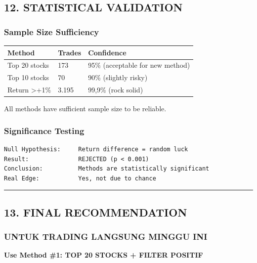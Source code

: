 \documentclass[
  10pt,
  a4paper,
]{article}
\begin{document}
\subsection{12. STATISTICAL VALIDATION}\label{statistical-validation}

\subsubsection{Sample Size Sufficiency}\label{sample-size-sufficiency}

\begin{longtable}[]{@{}lll@{}}
\toprule\noalign{}
Method & Trades & Confidence \\
\midrule\noalign{}
\endhead
\bottomrule\noalign{}
\endlastfoot
Top 20 stocks & 173 & 95\% (acceptable for new method) \\
Top 10 stocks & 70 & 90\% (slightly risky) \\
Return \textgreater+1\% & 3.195 & 99,9\% (rock solid) \\
\end{longtable}

All methods have sufficient sample size to be reliable.

\subsubsection{Significance Testing}\label{significance-testing}

\begin{verbatim}
Null Hypothesis:     Return difference = random luck
Result:              REJECTED (p < 0.001)
Conclusion:          Methods are statistically significant
Real Edge:           Yes, not due to chance
\end{verbatim}

\begin{center}\rule{0.5\linewidth}{0.5pt}\end{center}

\subsection{13. FINAL RECOMMENDATION}\label{final-recommendation}

\subsubsection{UNTUK TRADING LANGSUNG MINGGU
INI}\label{untuk-trading-langsung-minggu-ini}

\textbf{Use Method \#1: TOP 20 STOCKS + FILTER POSITIF}
\end{document}
